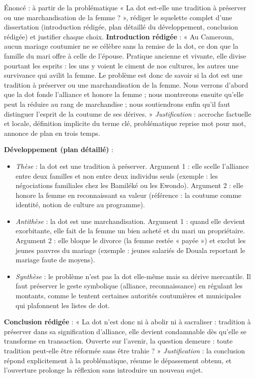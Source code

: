 \documentclass[11pt]{article}
\begin{document}
\begin{exoresolu}
Énoncé : à partir de la problématique « La dot est-elle une tradition à préserver ou une marchandisation de la femme ? », rédiger le squelette complet d'une dissertation (introduction rédigée, plan détaillé du développement, conclusion rédigée) et justifier chaque choix.
\tcblower
\textbf{Introduction rédigée} : « Au Cameroun, aucun mariage coutumier ne se célèbre sans la remise de la dot, ce don que la famille du mari offre à celle de l'épouse. Pratique ancienne et vivante, elle divise pourtant les esprits : les uns y voient le ciment de nos cultures, les autres une survivance qui avilit la femme. Le problème est donc de savoir si la dot est une tradition à préserver ou une marchandisation de la femme. Nous verrons d'abord que la dot fonde l'alliance et honore la femme ; nous montrerons ensuite qu'elle peut la réduire au rang de marchandise ; nous soutiendrons enfin qu'il faut distinguer l'esprit de la coutume de ses dérives. »
\emph{Justification} : accroche factuelle et locale, définition implicite du terme clé, problématique reprise mot pour mot, annonce de plan en trois temps.

\textbf{Développement (plan détaillé)} :
\begin{itemize}
\item \emph{Thèse} : la dot est une tradition à préserver. Argument 1 : elle scelle l'alliance entre deux familles et non entre deux individus seuls (exemple : les négociations familiales chez les Bamiléké ou les Ewondo). Argument 2 : elle honore la femme en reconnaissant sa valeur (référence : la coutume comme identité, notion de culture au programme).
\item \emph{Antithèse} : la dot est une marchandisation. Argument 1 : quand elle devient exorbitante, elle fait de la femme un bien acheté et du mari un propriétaire. Argument 2 : elle bloque le divorce (la femme restée « payée ») et exclut les jeunes pauvres du mariage (exemple : jeunes salariés de Douala reportant le mariage faute de moyens).
\item \emph{Synthèse} : le problème n'est pas la dot elle-même mais sa dérive mercantile. Il faut préserver le geste symbolique (alliance, reconnaissance) en régulant les montants, comme le tentent certaines autorités coutumières et municipales qui plafonnent les listes de dot.
\end{itemize}

\textbf{Conclusion rédigée} : « La dot n'est donc ni à abolir ni à sacraliser : tradition à préserver dans sa signification d'alliance, elle devient condamnable dès qu'elle se transforme en transaction. Ouverte sur l'avenir, la question demeure : toute tradition peut-elle être réformée sans être trahie ? »
\emph{Justification} : la conclusion répond explicitement à la problématique, résume le dépassement obtenu, et l'ouverture prolonge la réflexion sans introduire un nouveau sujet.
\end{exoresolu}
\end{document}
